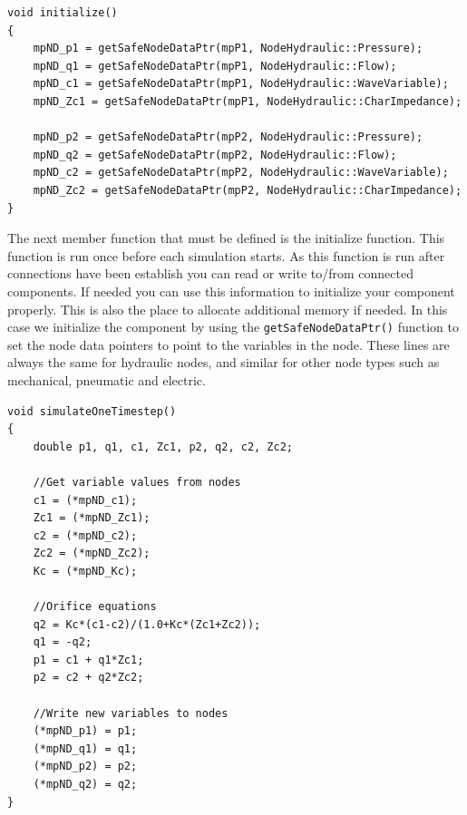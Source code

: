 \documentclass[a4paper,pdftex]{article}
\begin{document}
\begin{minipage}{\linewidth}
\begin{lstlisting}[firstnumber=28, basicstyle=\footnotesize\ttfamily]
void initialize()
{
    mpND_p1 = getSafeNodeDataPtr(mpP1, NodeHydraulic::Pressure);
    mpND_q1 = getSafeNodeDataPtr(mpP1, NodeHydraulic::Flow);
    mpND_c1 = getSafeNodeDataPtr(mpP1, NodeHydraulic::WaveVariable);
    mpND_Zc1 = getSafeNodeDataPtr(mpP1, NodeHydraulic::CharImpedance);

    mpND_p2 = getSafeNodeDataPtr(mpP2, NodeHydraulic::Pressure);
    mpND_q2 = getSafeNodeDataPtr(mpP2, NodeHydraulic::Flow);
    mpND_c2 = getSafeNodeDataPtr(mpP2, NodeHydraulic::WaveVariable);
    mpND_Zc2 = getSafeNodeDataPtr(mpP2, NodeHydraulic::CharImpedance);
}
\end{lstlisting}
\end{minipage}

\noindent The next member function that must be defined is the initialize function. 
This function is run once before each simulation starts. 
As this function is run after connections have been establish you can read or write to/from connected components. 
If needed you can use this information to initialize your component properly. 
This is also the place to allocate additional memory if needed. 
In this case we initialize the component by using the \texttt{getSafeNodeDataPtr()} function to set the node data pointers to point to the variables in the node. 
These lines are always the same for hydraulic nodes, and similar for other node types such as mechanical, pneumatic and electric.

\begin{minipage}{\linewidth}
\begin{lstlisting}[firstnumber=40, basicstyle=\footnotesize\ttfamily]
void simulateOneTimestep()
{
    double p1, q1, c1, Zc1, p2, q2, c2, Zc2;

    //Get variable values from nodes
    c1 = (*mpND_c1);
    Zc1 = (*mpND_Zc1);
    c2 = (*mpND_c2);
    Zc2 = (*mpND_Zc2);
    Kc = (*mpND_Kc);

    //Orifice equations
    q2 = Kc*(c1-c2)/(1.0+Kc*(Zc1+Zc2));
    q1 = -q2;
    p1 = c1 + q1*Zc1;
    p2 = c2 + q2*Zc2;

    //Write new variables to nodes
    (*mpND_p1) = p1;
    (*mpND_q1) = q1;
    (*mpND_p2) = p2;
    (*mpND_q2) = q2;
}
\end{lstlisting}
\end{minipage}
\end{document}
